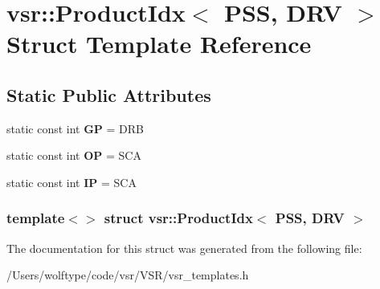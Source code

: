 \hypertarget{structvsr_1_1_product_idx_3_01_p_s_s_00_01_d_r_v_01_4}{\section{vsr\-:\-:Product\-Idx$<$ P\-S\-S, D\-R\-V $>$ Struct Template Reference}
\label{structvsr_1_1_product_idx_3_01_p_s_s_00_01_d_r_v_01_4}
}
\subsection*{Static Public Attributes}
\begin{DoxyCompactItemize}
\item 
\hypertarget{structvsr_1_1_product_idx_3_01_p_s_s_00_01_d_r_v_01_4_a97cf1c6f64235abe993b298b688306e0}{static const int {\bfseries G\-P} = D\-R\-B}\label{structvsr_1_1_product_idx_3_01_p_s_s_00_01_d_r_v_01_4_a97cf1c6f64235abe993b298b688306e0}

\item 
\hypertarget{structvsr_1_1_product_idx_3_01_p_s_s_00_01_d_r_v_01_4_a1c86c5c145aafdec69038a6c3a7df9b4}{static const int {\bfseries O\-P} = S\-C\-A}\label{structvsr_1_1_product_idx_3_01_p_s_s_00_01_d_r_v_01_4_a1c86c5c145aafdec69038a6c3a7df9b4}

\item 
\hypertarget{structvsr_1_1_product_idx_3_01_p_s_s_00_01_d_r_v_01_4_a54b991a83c3a7178a536cca31f2e4f99}{static const int {\bfseries I\-P} = S\-C\-A}\label{structvsr_1_1_product_idx_3_01_p_s_s_00_01_d_r_v_01_4_a54b991a83c3a7178a536cca31f2e4f99}

\end{DoxyCompactItemize}
\subsubsection*{template$<$$>$ struct vsr\-::\-Product\-Idx$<$ P\-S\-S, D\-R\-V $>$}



The documentation for this struct was generated from the following file\-:\begin{DoxyCompactItemize}
\item 
/\-Users/wolftype/code/vsr/\-V\-S\-R/vsr\-\_\-templates.\-h\end{DoxyCompactItemize}
